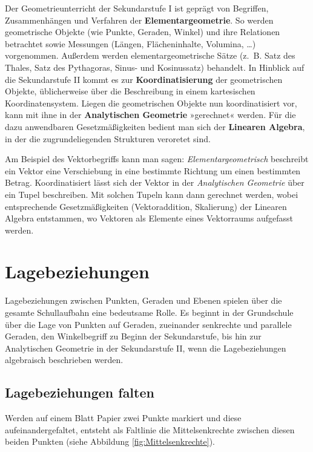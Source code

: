 \documentclass[
]{scrbook}
\theoremstyle{definition}
\theoremstyle{definition}
\theoremstyle{definition}
\theoremstyle{definition}
\theoremstyle{remark}
\begin{document}
Der Geometrieunterricht der Sekundarstufe I ist geprägt von Begriffen, Zusammenhängen und Verfahren der \textbf{Elementargeometrie}. So werden geometrische Objekte (wie Punkte, Geraden, Winkel) und ihre Relationen betrachtet sowie Messungen (Längen, Flächeninhalte, Volumina, \ldots) vorgenommen. Außerdem werden elementargeometrische Sätze (z.~B. Satz des Thales, Satz des Pythagoras, Sinus- und Kosinussatz) behandelt. In Hinblick auf die Sekundarstufe II kommt es zur \textbf{Koordinatisierung} der geometrischen Objekte, üblicherweise über die Beschreibung in einem kartesischen Koordinatensystem. Liegen die geometrischen Objekte nun koordinatisiert vor, kann mit ihne in der \textbf{Analytischen Geometrie} »gerechnet« werden. Für die dazu anwendbaren Gesetzmäßigkeiten bedient man sich der \textbf{Linearen Algebra}, in der die zugrundeliegenden Strukturen veroretet sind.

Am Beispiel des Vektorbegriffs kann man sagen: \emph{Elementargeometrisch} beschreibt ein Vektor eine Verschiebung in eine bestimmte Richtung um einen bestimmten Betrag. Koordinatisiert lässt sich der Vektor in der \emph{Analytischen Geometrie} über ein Tupel beschreiben. Mit solchen Tupeln kann dann gerechnet werden, wobei entsprechende Gesetzmäßigkeiten (Vektoraddition, Skalierung) der Linearen Algebra entstammen, wo Vektoren als Elemente eines Vektorraums aufgefasst werden.

\section{Lagebeziehungen}\label{lagebeziehungen}

Lagebeziehungen zwischen Punkten, Geraden und Ebenen spielen über die gesamte Schullaufbahn eine bedeutsame Rolle. Es beginnt in der Grundschule über die Lage von Punkten auf Geraden, zueinander senkrechte und parallele Geraden, den Winkelbegriff zu Beginn der Sekundarstufe, bis hin zur Analytischen Geometrie in der Sekundarstufe II, wenn die Lagebeziehungen algebraisch beschrieben werden.

\subsection{Lagebeziehungen falten}\label{lagebeziehungen-falten}

Werden auf einem Blatt Papier zwei Punkte markiert und diese aufeinandergefaltet, entsteht als Faltlinie die Mittelsenkrechte zwischen diesen beiden Punkten (siehe Abbildung \ref{fig:Mittelsenkrechte}).
\end{document}
